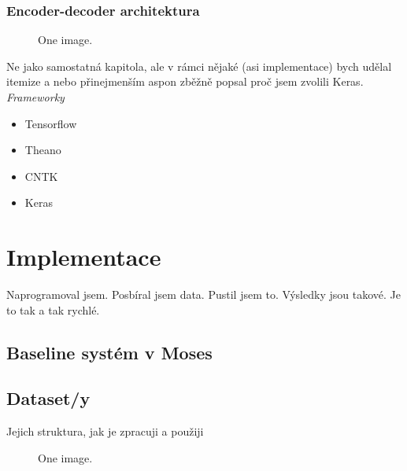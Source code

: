 \subsection{Encoder-decoder architektura}
\begin{figure}
    \begin{center}
    \end{center}
	\caption{One image. }
	\label{img:TODO}
\end{figure}




Ne jako samostatná kapitola, ale v rámci nějaké (asi implementace) bych udělal itemize a nebo přinejmenším aspon zběžně popsal proč jsem zvolili Keras.
\emph{Frameworky}
\begin{itemize}
  \item Tensorflow
  \item Theano
  \item CNTK
  \item Keras
\end{itemize}


\chapter{Implementace}
Naprogramoval jsem.
Posbíral jsem data.
Pustil jsem to.
Výsledky jsou takové.
Je to tak a tak rychlé.

\section{Baseline systém v Moses}

\section{Dataset/y}
Jejich struktura, jak je zpracuji a použiji
\begin{figure}
    \begin{center}
    \end{center}
	\caption{One image. }
	\label{img:TODO}
\end{figure}


